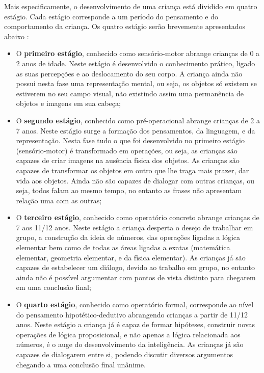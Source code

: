 Mais especificamente, o desenvolvimento de uma criança está dividido em quatro estágio. Cada estágio corresponde a um período do pensamento e do comportamento da criança. Os quatro estágio serão brevemente apresentados abaixo \cite{piaget:1972}:

\begin{itemize}
	\item O \textbf{primeiro estágio}, conhecido como sensório-motor abrange crianças de 0 a 2 anos de idade. Neste estágio é desenvolvido o conhecimento prático, ligado as suas percepções e ao deslocamento do seu corpo. A criança ainda não possui nesta fase uma representação mental, ou seja, os objetos só existem se estiverem no seu campo visual, não existindo assim uma permanência de objetos e imagens em sua cabeça;

	\item O \textbf{segundo estágio}, conhecido como pré-operacional abrange crianças de 2 a 7 anos. Neste estágio surge a formação dos pensamentos, da linguagem, e da representação. Nesta fase tudo o que foi desenvolvido no primeiro estágio (sensório-motor) é transformado em operações, ou seja, as crianças são capazes de criar imagens na ausência física dos objetos. As crianças são capazes de transformar os objetos em outro que lhe traga mais prazer, dar vida aos objetos. Ainda não são capazes de dialogar com outras crianças, ou seja, todos falam ao mesmo tempo, no entanto as frases não apresentam relação uma com as outras;

	\item O \textbf{terceiro estágio}, conhecido como operatório concreto abrange crianças de 7 aos 11/12 anos. Neste estágio a criança desperta o desejo de trabalhar em grupo, a construção da ideia de números, das operações ligadas a lógica elementar bem como de todas as áreas ligadas a exatas (matemática elementar, geometria elementar, e da física elementar). As crianças já são capazes de estabelecer um diálogo, devido ao trabalho em grupo, no entanto ainda não é possível argumentar com pontos de vista distinto para chegarem em uma conclusão final;

	\item O \textbf{quarto estágio}, conhecido como operatório formal, corresponde ao nível do pensamento hipotético-dedutivo abrangendo crianças a partir de 11/12 anos. Neste estágio a criança já é capaz de formar hipóteses, construir novas operações de lógica proposicional, e não apenas a lógica relacionada aos números, é o auge do desenvolvimento da inteligência. As crianças já são capazes de dialogarem entre si, podendo discutir diversos argumentos chegando a uma conclusão final unânime.
\end{itemize}

